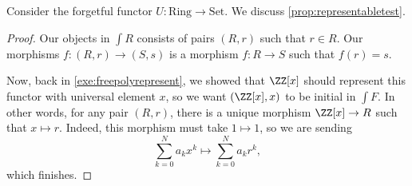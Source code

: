 \begin{exe}
	Consider the forgetful functor $U:\mathrm{Ring}\to\mathrm{Set}$. We discuss \autoref{prop:representabletest}.
\end{exe}
\begin{proof}
	Our objects in $\int R$ consists of pairs $(R,r)$ such that $r\in R$. Our morphisms $f:(R,r)\to(S,s)$ is a morphism $f:R\to S$ such that $f(r)=s$.

	Now, back in \autoref{exe:freepolyrepresent}, we showed that $\ZZ[x]$ should represent this functor with universal element $x$, so we want $(\ZZ[x],x)$ to be initial in $\int F$. In other words, for any pair $(R,r)$, there is a unique morphism $\ZZ[x]\to R$ such that $x\mapsto r$. Indeed, this morphism must take $1\mapsto1$, so we are sending
	\[\sum_{k=0}^Na_kx^k\longmapsto\sum_{k=0}^Na_kr^k,\]
	which finishes.
\end{proof}